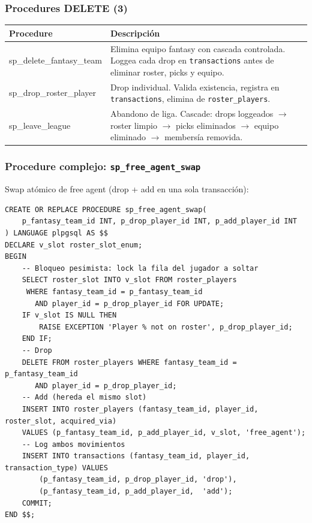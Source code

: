 \documentclass[12pt,a4paper]{article}
\begin{document}
\subsubsection{Procedures DELETE (3)}

\begin{longtable}{>{\ttfamily\small}p{5cm} p{8.5cm}}
\toprule
\normalfont\textbf{Procedure} & \textbf{Descripci\'on} \\
\midrule
sp\_delete\_fantasy\_team & Elimina equipo fantasy con cascada controlada. Loggea cada drop en \texttt{transactions} antes de eliminar roster, picks y equipo. \\[4pt]
sp\_drop\_roster\_player & Drop individual. Valida existencia, registra en \texttt{transactions}, elimina de \texttt{roster\_players}. \\[4pt]
sp\_leave\_league & Abandono de liga. Cascade: drops loggeados $\to$ roster limpio $\to$ picks eliminados $\to$ equipo eliminado $\to$ members\'ia removida. \\
\bottomrule
\end{longtable}

\subsubsection{Procedure complejo: \texttt{sp\_free\_agent\_swap}}

Swap at\'omico de free agent (drop + add en una sola transacci\'on):

\begin{lstlisting}
CREATE OR REPLACE PROCEDURE sp_free_agent_swap(
    p_fantasy_team_id INT, p_drop_player_id INT, p_add_player_id INT
) LANGUAGE plpgsql AS $$
DECLARE v_slot roster_slot_enum;
BEGIN
    -- Bloqueo pesimista: lock la fila del jugador a soltar
    SELECT roster_slot INTO v_slot FROM roster_players
     WHERE fantasy_team_id = p_fantasy_team_id
       AND player_id = p_drop_player_id FOR UPDATE;
    IF v_slot IS NULL THEN
        RAISE EXCEPTION 'Player % not on roster', p_drop_player_id;
    END IF;
    -- Drop
    DELETE FROM roster_players WHERE fantasy_team_id = p_fantasy_team_id
       AND player_id = p_drop_player_id;
    -- Add (hereda el mismo slot)
    INSERT INTO roster_players (fantasy_team_id, player_id, roster_slot, acquired_via)
    VALUES (p_fantasy_team_id, p_add_player_id, v_slot, 'free_agent');
    -- Log ambos movimientos
    INSERT INTO transactions (fantasy_team_id, player_id, transaction_type) VALUES
        (p_fantasy_team_id, p_drop_player_id, 'drop'),
        (p_fantasy_team_id, p_add_player_id,  'add');
    COMMIT;
END $$;
\end{lstlisting}
\end{document}
